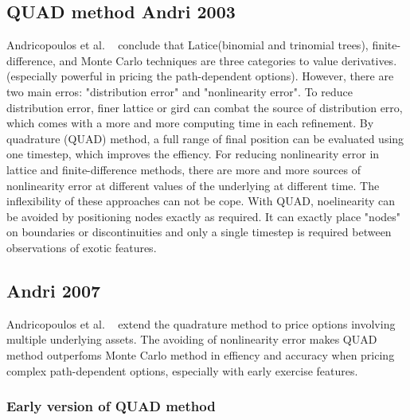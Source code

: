 \documentclass{article}
\numberwithin{equation}{section}
\begin{document}
\subsection*{QUAD method Andri 2003}
Andricopoulos et al. ~\cite{Andri_2003} conclude that Latice(binomial and trinomial trees), finite-difference, and Monte Carlo techniques are three categories to 
value derivatives.(especially powerful in pricing the path-dependent options). However, there are two main erros: "distribution error" and "nonlinearity error". 
To reduce distribution error, finer lattice or gird can combat the source of distribution erro, which comes with a more and more computing time in each refinement.
 By quadrature (QUAD) method, a full range of final position can be evaluated using one timestep, which improves the effiency. For reducing nonlinearity error in 
 lattice and finite-difference methods, there are more and more sources of nonlinearity error at different values of the underlying at different time. The 
 inflexibility of these approaches can not be cope. With QUAD, noelinearity can be avoided by positioning nodes exactly as required. It can exactly place "nodes"
 on boundaries or discontinuities and only a single timestep is required between observations of exotic features.

 

 \subsection*{Andri 2007}
 Andricopoulos et al. ~\cite{Andri_2007} extend the quadrature method to price options involving multiple underlying assets. The avoiding of nonlinearity error 
 makes QUAD method outperfoms Monte Carlo method in effiency and accuracy when pricing complex path-dependent options, especially with early exercise features.
 \subsubsection*{Early version of QUAD method}
\end{document}
